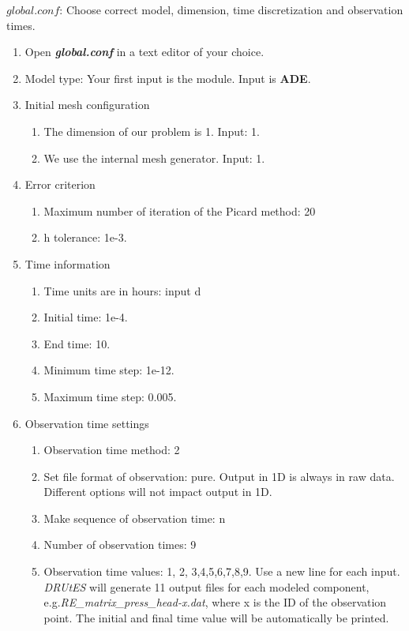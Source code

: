 \documentclass[
10pt, %
a4paper, %
oneside, %
headinclude,footinclude, %
BCOR5mm, %
]{scrartcl}
\begin{document}
$global.conf$: Choose correct model, dimension, time discretization and observation times.
\begin{enumerate}
\item Open \textbf{\emph{global.conf}} in a text editor of your choice. 
\item Model type: Your first input is the module. Input is \textbf{ADE}.
\item Initial mesh configuration \begin{enumerate}
\item The dimension of our problem is 1. Input: 1.
\item We use the internal mesh generator. Input: 1. 
\end{enumerate}
\item Error criterion \begin{enumerate} 
\item Maximum number of iteration of the Picard method: 20 
\item h tolerance: 1e-3.
\end{enumerate}
\item Time information 
\begin{enumerate} 
\item Time units are in hours: input d
\item Initial time: 1e-4.
\item End time: 10.
\item Minimum time step: 1e-12.
\item Maximum time step: 0.005.
\end{enumerate}
\item Observation time settings \begin{enumerate}
\item Observation time method: 2
\item Set file format of observation: pure. Output in 1D is always in raw data. Different options will not impact output in 1D.
\item Make sequence of observation time: n
\item Number of observation times: 9
\item Observation time values: 1, 2, 3,4,5,6,7,8,9. Use a new line for each input. \textit{DRUtES} will generate 11 output files for each modeled component, e.g.\textit{RE\_matrix\_press\_head-x.dat}, where x is the ID of the observation point. The initial and final time value will be automatically be printed.
\end{enumerate}

\end{enumerate}
\end{document}
